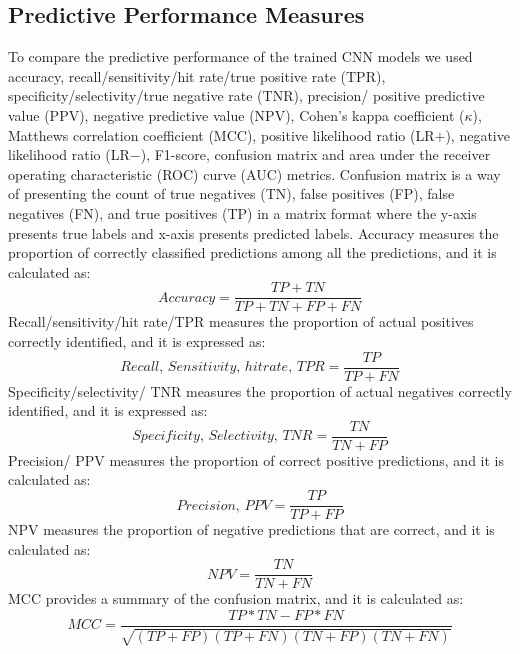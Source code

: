 \subsection{Predictive Performance Measures}
To compare the predictive performance of the trained CNN models we used accuracy, recall/sensitivity/hit rate/true positive rate (TPR), specificity/selectivity/true negative rate (TNR), precision/ positive predictive value (PPV), negative predictive value (NPV), Cohen’s kappa coefficient ($\kappa$), Matthews correlation coefficient (MCC), positive likelihood ratio (LR$+$), negative likelihood ratio (LR$-$), F1-score, confusion matrix and area under the receiver operating characteristic (ROC) curve (AUC) metrics. Confusion matrix is a way of presenting the count of true negatives (TN), false positives (FP), false negatives (FN), and true positives (TP) in a matrix format where the y-axis presents true labels and x-axis presents predicted labels. Accuracy measures the proportion of correctly classified predictions among all the predictions, and it is calculated as:
\begin{equation}
	Accuracy =\frac{TP+TN}{TP+TN+FP+FN}
\end{equation}
Recall/sensitivity/hit rate/TPR measures the proportion of actual positives correctly identified, and it is expressed as:
\begin{equation}
	Recall,\, Sensitivity,\, hit rate,\, T P R=\frac{T P}{T P+F N}
\end{equation}
Specificity/selectivity/ TNR measures the proportion of actual negatives correctly identified, and it is expressed as:
\begin{equation}
	Specificity,\, Selectivity,\, TNR =\frac{T N}{T N+F P}
\end{equation}
Precision/ PPV measures the proportion of correct positive predictions, and it is calculated as:
\begin{equation}
	Precision,\, P P V=\frac{T P}{T P+F P}
\end{equation}
NPV measures the proportion of negative predictions that are correct, and it is calculated as:
\begin{equation}
	N P V=\frac{T N}{T N+F N}
\end{equation}
MCC provides a summary of the confusion matrix, and it is calculated as:
\begin{equation}
	M C C=\frac{T P * T N-F P * F N}{\sqrt{(T P+F P)(T P+F N)(T N+F P)(T N+F N)}}
\end{equation}
